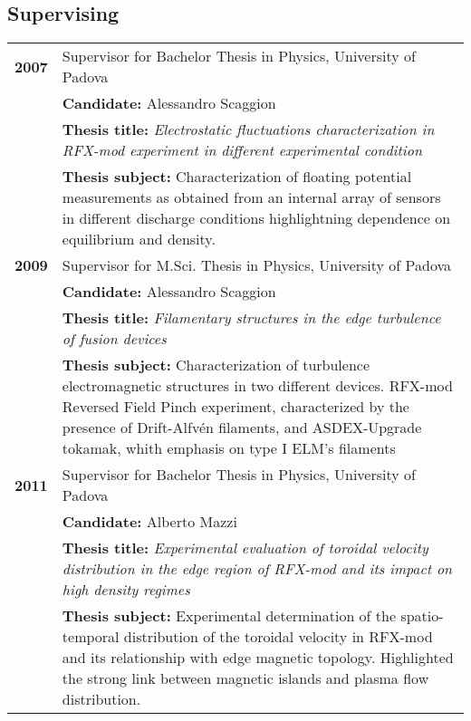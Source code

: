 \subsection{Supervising}
\begin{longtable}{>{\bfseries}l p{15cm}}
2007 & Supervisor for Bachelor Thesis in Physics, University of Padova \\
 & \textbf{Candidate:} Alessandro Scaggion \\
 & \textbf{Thesis title:} \emph{Electrostatic fluctuations characterization in
   RFX-mod experiment in different experimental condition} \\
 & \textbf{Thesis subject:} Characterization of floating potential
 measurements as obtained from an internal array of sensors in
 different discharge conditions highlightning dependence on
 equilibrium and density. \\
2009 & Supervisor for M.Sci. Thesis in Physics, University of Padova \\
 & \textbf{Candidate:} Alessandro Scaggion \\
& \textbf{Thesis title:} \emph{Filamentary structures in the edge
  turbulence of fusion devices} \\
& \textbf{Thesis subject:} Characterization of turbulence
electromagnetic structures in two different devices. RFX-mod Reversed
Field Pinch experiment, characterized by the presence of
Drift-Alfv\'en filaments, and ASDEX-Upgrade tokamak, whith emphasis on
type I ELM's filaments \\
2011 & Supervisor for Bachelor Thesis in Physics, University of Padova \\
 & \textbf{Candidate:} Alberto Mazzi \\
 & \textbf{Thesis title:} \emph{Experimental evaluation of toroidal
   velocity distribution in the edge region of RFX-mod and its impact
   on high density regimes } \\
 & \textbf{Thesis subject:} Experimental determination of the
 spatio-temporal distribution of the toroidal
 velocity  in RFX-mod and its relationship with edge magnetic
 topology. Highlighted the strong link between magnetic islands and
 plasma flow distribution.\\

\end{longtable}
